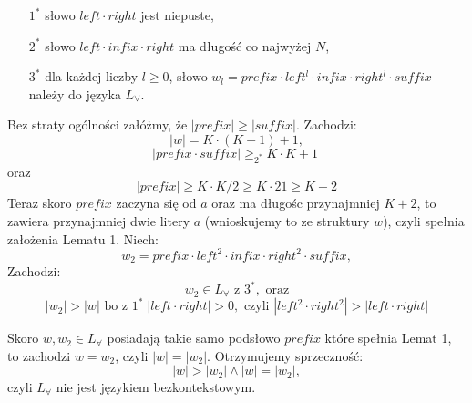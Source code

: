\documentclass{article}
\begin{document}
\begin{itemize}
	\item[$1^*$] słowo $left \cdot right$ jest niepuste,
	\item[$2^*$] słowo $left \cdot infix \cdot right$ ma długość co najwyżej $N$,
	\item[$3^*$] dla każdej liczby $l \ge 0$, słowo $w_l = prefix \cdot left^l \cdot infix \cdot right^l \cdot suffix$ należy do języka $L_{\forall}$.
\end{itemize}

Bez straty ogólności załóżmy, że $|prefix| \ge |suffix|$. \newline
Zachodzi: 
$$ |w| = K \cdot (K+1) + 1, $$
$$|prefix \cdot suffix| \ge_{2^*} K \cdot K + 1 \; \mbox{}$$
oraz
$$|prefix| \ge K \cdot K/2 \ge K \cdot 21 \ge K + 2$$
Teraz skoro $prefix$ zaczyna się od $a$ oraz ma długośc przynajmniej $K+2$, to zawiera przynajmniej dwie litery $a$ (wnioskujemy to ze struktury $w$), czyli spełnia założenia Lematu 1. \newline 
Niech:
$$w_2 = prefix \cdot left^2 \cdot infix \cdot right^2 \cdot suffix,$$
Zachodzi:
$$w_2 \in L_{\forall} \mbox{ z } 3^*, \mbox{ oraz}$$ 
$$|w_2| > |w| \mbox{ bo z } 1^* \; |left \cdot right| > 0, \mbox{ czyli } |left^2 \cdot right^2| > |left \cdot right|$$

Skoro $w, w_2 \in L_{\forall}$ posiadają takie samo podsłowo $prefix$ które spełnia Lemat 1, to zachodzi $w = w_2$,
czyli $|w| = |w_2|$. \newline \newline
Otrzymujemy sprzeczność:
$$ |w| > |w_2| \land |w| = |w_2|,$$
czyli $L_{\forall}$ nie jest językiem bezkontekstowym.
\end{document}
